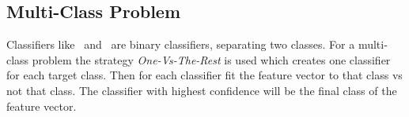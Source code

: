 \subsection{Multi-Class Problem}
Classifiers like \nb\ and \svm\ are binary classifiers, separating two classes. For a multi-class problem the strategy \emph{One-Vs-The-Rest} is used which creates one classifier for each target class. Then for each classifier fit the feature vector to that class vs not that class. The classifier with highest confidence will be the final class of the feature vector.